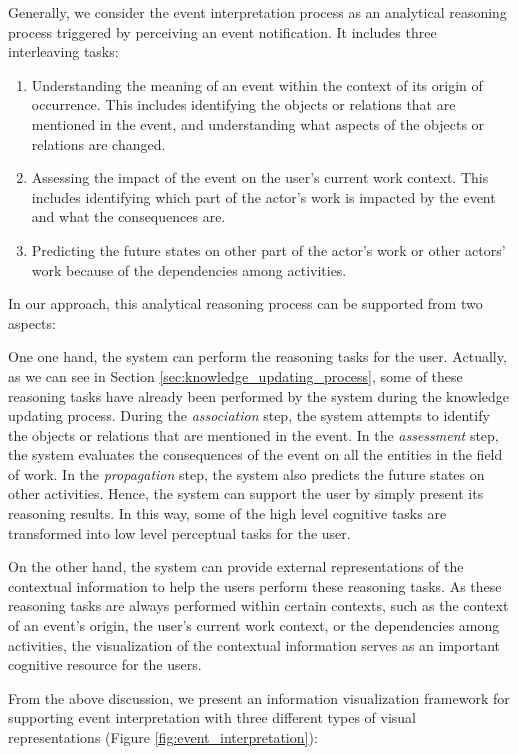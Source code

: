 Generally, we consider the event interpretation process as an analytical reasoning process triggered by perceiving an event notification. It includes three interleaving tasks:
\begin{enumerate}
	\item Understanding the meaning of an event within the context of its origin of occurrence. This includes identifying the objects or relations that are mentioned in the event, and understanding what aspects of the objects or relations are changed. 
	\item Assessing the impact of the event on the user's current work context. This includes identifying which part of the actor's work is impacted by the event and what the consequences are.
	\item Predicting the future states on other part of the actor's work or other actors' work because of the dependencies among activities.
\end{enumerate}

In our approach, this analytical reasoning process can be supported from two aspects:

One one hand, the system can perform the reasoning tasks for the user. Actually, as we can see in Section \ref{sec:knowledge_updating_process}, some of these reasoning tasks have already been performed by the system during the knowledge updating process. During the \emph{association} step, the system attempts to identify the objects or relations that are mentioned in the event. In the \emph{assessment} step, the system evaluates the consequences of the event on all the entities in the field of work. In the \emph{propagation} step, the system also predicts the future states on other activities. Hence, the system can support the user by simply present its reasoning results. In this way, some of the high level cognitive tasks are transformed into low level perceptual tasks for the user.

On the other hand, the system can provide external representations of the contextual information to help the users perform these reasoning tasks. As these reasoning tasks are always performed within certain contexts, such as the context of an event's origin, the user's current work context, or the dependencies among activities, the visualization of the contextual information serves as an important cognitive resource for the users.

From the above discussion, we present an information visualization framework for supporting event interpretation with three different types of visual representations (Figure \ref{fig:event_interpretation}):

